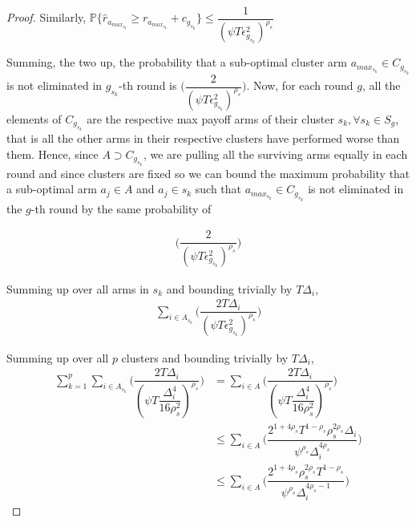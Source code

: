 \begin{proof}
 
Similarly, $\mathbb{P}\lbrace\hat{r}_{a_{max_{s_{k}}}}\geq r_{a_{max_{s_{k}}}} + c_{g_{s_{k}}}\rbrace\leq \dfrac{1}{(\psi T\epsilon_{g_{s_{k}}}^{2})^{\rho_{s}}}$
 
Summing, the two up, the probability that a sub-optimal cluster arm $a_{max_{s_{k}}}\in C_{g_{s_{k}}}$ is not eliminated in $g_{s_{k}}$-th round is  $\bigg(\dfrac{2}{(\psi  T\epsilon_{g_{s_{k}}}^{2})^{\rho_{s}}}\bigg)$. 
  Now, for each round $g$, all the elements of $C_{g_{s_{k}}}$ are the respective max payoff arms of their cluster $s_{k}, \forall s_{k}\in S_{g}$, that is all the other arms in their respective clusters have performed worse than them. Hence, since $A\supset C_{g_{s_{k}}}$, we are pulling all the surviving arms equally in each round and since clusters are fixed so we can bound the maximum probability that a sub-optimal arm $a_{j}\in A$  and $a_{j}\in s_{k}$ such that $a_{max_{s_{k}}}\in C_{g_{s_{k}}}$ is not eliminated in the $g$-th round by the same probability of 
  
\begin{align*}
\bigg(\dfrac{2}{(\psi T\epsilon_{g_{s_{k}}}^{2})^{\rho_{s}}}\bigg)
\end{align*}  
 
 
Summing up over all arms in $s_{k}$ and bounding trivially by $T\Delta_{i}$,
\begin{align*}
\sum_{i\in A_{s_{k}}}\bigg(\dfrac{2T\Delta_{i}}{(\psi T\epsilon_{g_{s_{k}}}^{2})^{\rho_{s}}}\bigg)
\end{align*}

 
Summing up over all $p$ clusters and bounding trivially by $T\Delta_{i}$,
 \begin{align*}
 \sum_{k=1}^{p}\sum_{i\in A_{s_{k}}}\bigg(\dfrac{2T\Delta_{i}}{(\psi T\dfrac{\Delta_{i}^{4}}{16\rho_{s}^{2}})^{\rho_{s}}}\bigg) &= \sum_{i\in A}\bigg(\dfrac{2T\Delta_{i}}{(\psi  T\dfrac{\Delta_{i}^{4}}{16\rho_{s}^{2}})^{\rho_{s}}}\bigg) \\
 &\leq \sum_{i\in A}\bigg(\dfrac{2^{1+4\rho_{s}}T^{1-\rho_{s}}\rho_{s}^{2\rho_{s}}\Delta_{i}}{\psi^{\rho_{s}}\Delta_{i}^{4\rho_{s}}}\bigg)\\
 &\leq \sum_{i\in A}\bigg(\dfrac{2^{1+4\rho_{s}}\rho_{s}^{2\rho_{s}}T^{1-\rho_{s}}}{\psi^{\rho_{s}}\Delta_{i}^{4\rho_{s}-1}}\bigg)
 \end{align*}


\end{proof}
